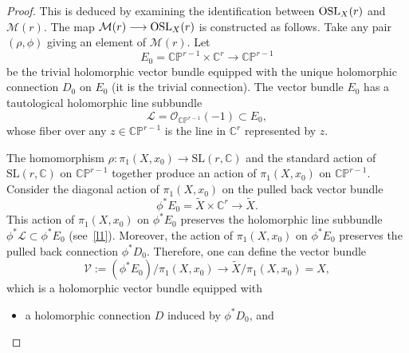\documentclass[pdftex]{sigma}
\numberwithin{equation}{section}
\begin{document}
\begin{proof}
This is deduced by examining the identification between ${\rm OSL}_X(r)$ and
${\mathcal M}(r)$. The map ${\mathcal M}(r) \longrightarrow {\rm OSL}_X(r)$
is constructed as follows. Take any pair $(\rho, \phi)$ giving an element of
${\mathcal M}(r)$. Let
\[
E_0 = {\mathbb C}{\mathbb P}^{r-1}\times {\mathbb C}^r \longrightarrow
{\mathbb C}{\mathbb P}^{r-1}
\]
be the trivial holomorphic vector bundle equipped with the unique holomorphic
connection $D_0$ on $E_0$ (it is the trivial connection). The vector bundle
$E_0$ has a tautological holomorphic line subbundle
\begin{equation}\label{l1}
{\mathcal L} = {\mathcal O}_{{\mathbb C}{\mathbb P}^{r-1}}(-1) \subset E_0,
\end{equation}
whose fiber over any $z \in {\mathbb C}{\mathbb P}^{r-1}$ is the line in
${\mathbb C}^r$ represented by $z$.

The homomorphism $\rho\colon
\pi_1(X, x_0) \longrightarrow \text{SL}(r, {\mathbb C})$ and the standard
action of $\text{SL}(r, {\mathbb C})$ on ${\mathbb C}{\mathbb P}^{r-1}$ together
produce an action of $\pi_1(X, x_0)$ on ${\mathbb C}{\mathbb P}^{r-1}$. Consider
the diagonal action of $\pi_1(X, x_0)$ on the pulled back vector bundle
\[
\phi^*E_0 = \widetilde{X}\times {\mathbb C}^r \longrightarrow \widetilde{X}.
\]
This action of $\pi_1\!(X, x_0)$ on $\phi^*E_0$ preserves the holomorphic
line subbundle $\phi^*{\mathcal L} \!\subset \!\phi^*E_0$ (see~\eqref{l1}). Moreover,
the action of $\pi_1(X, x_0)$ on $\phi^*E_0$ preserves the pulled back
connection $\phi^* D_0$. Therefore, one can define the vector bundle
\begin{equation}\label{l2}
{\mathcal V} := (\phi^*E_0)/\pi_1(X, x_0) \longrightarrow
\widetilde{X}/\pi_1(X, x_0) = X,
\end{equation}
which is a holomorphic vector bundle equipped with
\begin{itemize}\itemsep=0pt
\item a holomorphic connection $D$ induced by $\phi^* D_0$, and


\end{itemize}
\end{proof}
\end{document}

